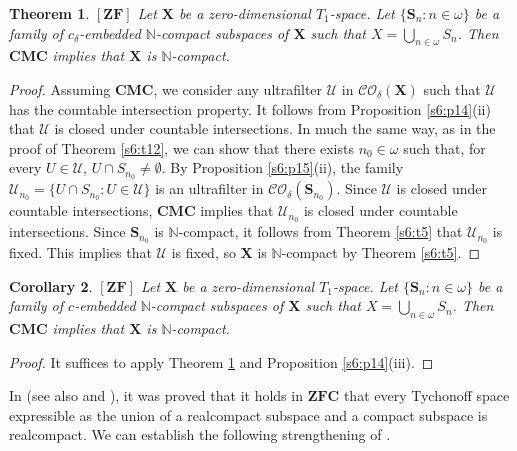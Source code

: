 \documentclass[12pt,twoside,leqno]{article}
\theoremstyle{plain}
\newtheorem{theorem}{Theorem}[section]
\newtheorem{corollary}[theorem]{Corollary}
\theoremstyle{definition}
\theoremstyle{remark}
\begin{document}
\begin{theorem}
	\label{s6:t16}
	$[\mathbf{ZF}]$ Let $\mathbf{X}$ be a zero-dimensional  $T_1$-space. Let $\{\mathbf{S}_n: n\in\omega\}$ be a family of $c_{\delta}$-embedded $\mathbb{N}$-compact subspaces of $\mathbf{X}$ such that $X=\bigcup\limits_{n\in\omega}S_n$. Then $\mathbf{CMC}$ implies that $\mathbf{X}$ is $\mathbb{N}$-compact. 
\end{theorem}
\begin{proof}
	Assuming $\mathbf{CMC}$, we consider any ultrafilter $\mathcal{U}$ in $\mathcal{CO}_{\delta}(\mathbf{X})$ such that $\mathcal{U}$ has the countable intersection property. It follows from Proposition \ref{s6:p14}(ii) that $\mathcal{U}$ is closed under countable intersections. In much the same way, as in the proof of Theorem \ref{s6:t12}, we can show that there exists $n_0\in\omega$ such that, for every $U\in\mathcal{U}$, $U\cap S_{n_0}\neq\emptyset$. By Proposition \ref{s6:p15}(ii), the family $\mathcal{U}_{n_0}=\{U\cap S_{n_0}: U\in\mathcal{U}\}$ is an ultrafilter in $\mathcal{CO}_{\delta}(\mathbf{S}_{n_0})$. Since $\mathcal{U}$ is closed under countable intersections, $\mathbf{CMC}$ implies that $\mathcal{U}_{n_0}$ is closed under countable intersections. Since $\mathbf{S}_{n_0}$ is $\mathbb{N}$-compact, it follows from Theorem \ref{s6:t5} that $\mathcal{U}_{n_0}$ is fixed. This implies that $\mathcal{U}$ is fixed, so $\mathbf{X}$ is $\mathbb{N}$-compact by Theorem \ref{s6:t5}.
\end{proof}

\begin{corollary}
	\label{s6:c17}
	$[\mathbf{ZF}]$ Let $\mathbf{X}$ be a zero-dimensional $T_1$-space. Let $\{\mathbf{S}_n: n\in\omega\}$ be a family of $c$-embedded $\mathbb{N}$-compact subspaces of $\mathbf{X}$ such that $X=\bigcup\limits_{n\in\omega}S_n$. Then $\mathbf{CMC}$ implies that $\mathbf{X}$ is $\mathbb{N}$-compact. 
\end{corollary}
\begin{proof}
	It suffices to apply Theorem \ref{s6:t16} and Proposition \ref{s6:p14}(iii). 
\end{proof}

In \cite[Fact 21]{nik} (see also \cite[Theorem 8.16]{gj} and \cite[Exercise 3.11 A]{en}), it was proved that it holds in $\mathbf{ZFC}$ that every Tychonoff space expressible as the union of a realcompact subspace and a compact subspace is realcompact. We can establish the following strengthening of \cite[Fact 21]{nik}.
\end{document}
